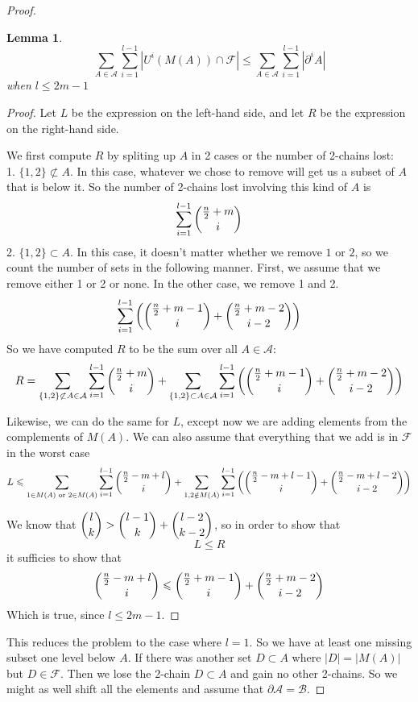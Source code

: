 \documentclass[12pt]{article}
\theoremstyle{plain}
\newtheorem{lemma}[theorem]{Lemma}
\theoremstyle{definition}
\theoremstyle{remark}
\newcommand{\F}{\mathcal{F}}
\newcommand{\A}{\mathcal{A}}
\newcommand{\B}{\mathcal{B}}
\begin{document}
\begin{proof}
\begin{lemma} 
\label{lemma1}
\[ \sum_{A\in \A}\sum_{i = 1}^{l-1} |U^i(M(A)) \cap \F| \leq \sum_{A \in \A}\sum_{i = 1}^{l-1} |\partial^i A | \]
when $l \leq 2m-1$
\end{lemma}

\begin{proof}
Let $L$ be the expression on the left-hand side, and let $R$ be the expression on the right-hand side.

We first compute $R$ by spliting up $A$ in 2 cases or the number of 2-chains lost:\\
1. $\{ 1, 2 \} \not\subset A$. In this case, whatever we chose to remove will get us a subset of $A$ that is below it. So the number of 2-chains lost involving this kind of $A$ is
\[ \sum_{i=1}^{l-1} \dbinom{\frac{n}{2} + m}{i} \]
2. $\{ 1, 2 \} \subset A$. In this case, it doesn't matter whether we remove $1$ or $2$, so we count the number of sets in the following manner. First, we assume that we remove either 1 or 2 or none. In the other case, we remove 1 and 2.
\[ \sum_{i=1}^{l-1} \left(\dbinom{\frac{n}{2} + m - 1}{i} + \dbinom{\frac{n}{2}+m-2}{i-2} \right) \]
So we have computed $R$ to be the sum over all $A \in \A$:
\[ R = \sum_{\{1, 2\} \not\subset A \in \A} \sum_{i=1}^{l-1} \dbinom{\frac{n}{2} + m}{i} + \sum_{\{1, 2\} \subset A \in \A} \sum_{i=1}^{l-1} \left( \dbinom{\frac{n}{2}+m-1}{i} + \dbinom{\frac{n}{2}+m-2}{i-2}\right) \]

Likewise, we can do the same for $L$, except now we are adding elements from the complements of $M(A)$. We can also assume that everything that we add is in $\F$ in the worst case
\[ L \leq \sum_{1 \in M(A) \text{ or } 2 \in M(A)} \sum_{i=1}^{l-1} \dbinom{\frac{n}{2}-m+l}{i} + \sum_{1, 2 \notin M(A)} \sum_{i=1}^{l-1} \left( \dbinom{\frac{n}{2}-m+l-1}{i} + \dbinom{\frac{n}{2}-m+l-2}{i-2} \right) \]

We know that $\dbinom{l}{k} > \dbinom{l-1}{k} + \dbinom{l-2}{k-2}$, so in order to show that 
\[ L \leq R \]
it sufficies to show that
\[ \dbinom{\frac{n}{2}-m+l}{i} \leq \dbinom{\frac{n}{2}+m-1}{i} + \dbinom{\frac{n}{2}+m-2}{i-2} \]
Which is true, since $l \leq 2m-1$.
\end{proof}

This reduces the problem to the case where $l=1$. So we have at least one missing subset one level below $A$. If there was another set $D \subset A$ where $|D| = |M(A)|$ but $D \in \F$. Then we lose the 2-chain $D \subset A$ and gain no other 2-chains. So we might as well shift all the elements and assume that $\partial \A = \B$. 


\end{proof}
\end{document}
